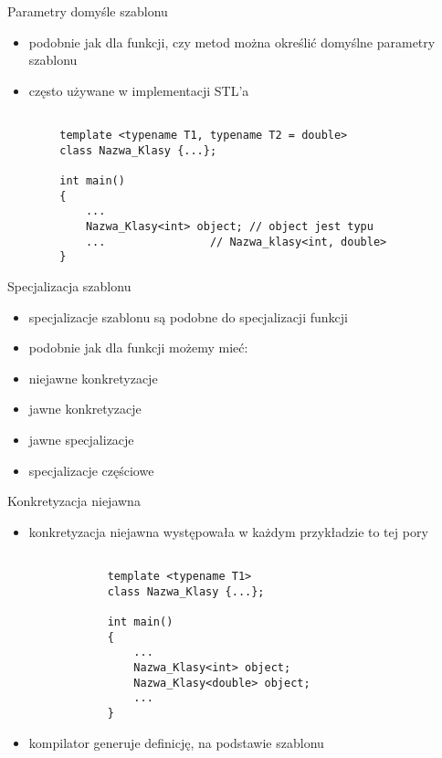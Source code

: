 \documentclass[11pt]{beamer}
\begin{document}
\begin{frame}[fragile]{Parametry domyśle szablonu}
	\begin{itemize}
		\item podobnie jak dla funkcji, czy metod można określić domyślne parametry szablonu
		\item często używane w implementacji STL'a
			
	\end{itemize}
	
	\begin{lstlisting}[frame=single]  % Start your code-block
		
		template <typename T1, typename T2 = double> 
		class Nazwa_Klasy {...};
		
		int main()
		{
			...
			Nazwa_Klasy<int> object; // object jest typu
			...	               // Nazwa_klasy<int, double>
		}
	\end{lstlisting}

\end{frame}




\begin{frame}[fragile]{Specjalizacja szablonu}
	\begin{itemize}
		\item specjalizacje szablonu są podobne do specjalizacji funkcji
		\item podobnie jak dla funkcji możemy mieć:
		\item niejawne konkretyzacje
		\item jawne konkretyzacje
		\item jawne specjalizacje
		\item specjalizacje częściowe
			
	\end{itemize}

\end{frame}


\begin{frame}[fragile]{Konkretyzacja niejawna}
	\begin{itemize}
		\item konkretyzacja niejawna występowała w każdym przykładzie to tej pory
		\begin{lstlisting}[frame=single]  % Start your code-block
		
			template <typename T1> 
			class Nazwa_Klasy {...};
		
			int main()
			{
				...
				Nazwa_Klasy<int> object;
				Nazwa_Klasy<double> object;
				...
			}
		\end{lstlisting}
		\item kompilator generuje definicję, na podstawie szablonu
	\end{itemize}

\end{frame}
\end{document}
